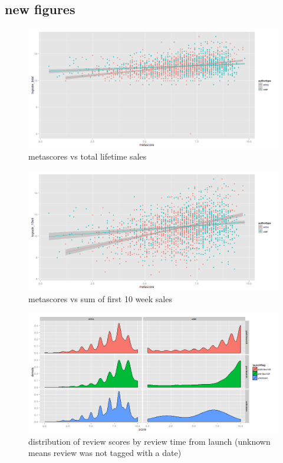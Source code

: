 \documentclass[letterpaper]{article}
\begin{document}
\subsection{new figures}
\begin{figure}[tbph]
\centering
\includegraphics[width=\linewidth]{game_metascore_vs_totalsales}
\caption{metascores vs total lifetime sales}
\label{fig:metascore_totsale}
\end{figure}

\begin{figure}[tbph]
\centering
\includegraphics[width=\linewidth]{game_metascore_vs_10wksales}
\caption{metascores vs sum of first 10 week sales}
\label{fig:metascore_10wksale}
\end{figure}

\begin{figure}[tbph]
\centering
\includegraphics[width=\linewidth]{./review_score_timing_distribution}
\caption{distribution of review scores by review time from launch (unknown means review was not tagged with a date)}
\label{fig:review_score_timing_distribution}
\end{figure}
\end{document}

